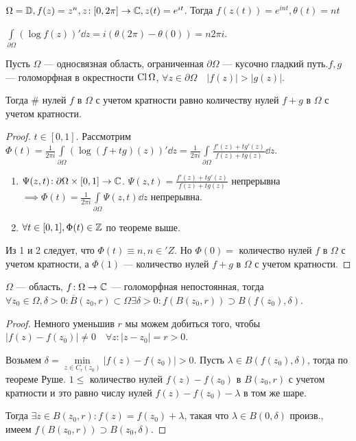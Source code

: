 \begin{example}
    $\Omega = \mathbb{D}, f(z) = z^n, z\!: [0, 2\pi] \to \mathbb{C}, z(t) = e^{it}$. Тогда $f(z(t)) = e^{i n t}, \theta(t) = nt$ 

    $\int\limits_{\partial \Omega} \left( \log f(z) \right)' \dd{z} = i(\theta(2\pi) - \theta(0)) = n 2 \pi i$.
\end{example}
\begin{theorem}
    Пусть $\Omega$ --- односвязная область, ограниченная  $\partial \Omega$ --- кусочно гладкий путь.$f, g$ --- голоморфная в окрестности  $\operatorname{Cl} \Omega$, $\forall z \in \partial \Omega\quad |f(z)| > |g(z)|$.

    Тогда  \# нулей $f$ в  $\Omega$ с учетом кратности равно количеству нулей  $f+g$ в  $\Omega$ с учетом кратности.
\end{theorem}
\begin{proof}
    $t \in [0, 1]$. Рассмотрим  $\Phi(t) = \frac{1}{2 \pi i} \int\limits_{\partial \Omega} (\log (f+tg) (z))' \dd{z} = \frac{1}{2 \pi i}\int\limits_{\partial \Omega} \frac{f'(z) + tg'(z)}{f(z) + tg(z)} \dd{z}$.

    \begin{enumerate}
        \item $\Psi(z, t)\!: \partial  \Omega \times [0, 1] \to \mathbb{C}$.  $\Psi(z, t) = \frac{f'(z) + tg'(z)}{f(z) + tg(z)}$ непрерывна $\implies \Phi(t) = \frac{1}{2 \pi i} \int\limits_{\partial \Omega} \Psi(z, t) \dd{z}$ непрерывна.
        \item $\forall t \in [0, 1], \Phi(t) \in \mathbb{Z}$ по теореме выше.
    \end{enumerate}

    Из 1 и 2 следует, что $\Phi(t) \equiv n, n \in 'Z$. Но  $\Phi(0) =$ количество нулей  $f$ в  $\Omega$ с учетом кратности, а  $\Phi(1)$ --- количество нулей  $f+g$ в  $\Omega$ с учетом кратности.
\end{proof}
\begin{theorem}
    $\Omega$ --- область,  $f\!: \Omega \to \mathbb{C}$ --- голоморфная непостоянная, тогда $\forall z_0 \in \Omega, \delta > 0\!: \overline{B}(z_0, r) \subset \Omega \exists \delta > 0\!: f(B(z_0, r)) \supset B(f(z_0), \delta)$.
\end{theorem}
\begin{proof}
    Немного уменьшив $r$ мы можем добиться того, чтобы  $|f(z) - f(z_0)| \neq 0\quad \forall z \!: |z-z_0| = r > 0$.

    Возьмем $\delta = \min\limits_{z \in C_r(z_0)} |f(z) - f(z_0)| > 0$. Пусть $\lambda \in B(f(z_0), \delta)$, тогда по теореме Руше. $1 \le $ количество нулей $f(z) - f(z_0)$ в $B(z_0, r)$ с учетом кратности и это равно числу нулей $f(z) - f(z_0) - \lambda$ в том же шаре.

    Тогда $\exists z \in B(z_0, r)\!: f(z) = f(z_0) + \lambda$, такая что $\lambda \in B(0, \delta)$ произв., имеем  $f(B(z_0, r)) \supset B(z_0, \delta)$.
\end{proof}
